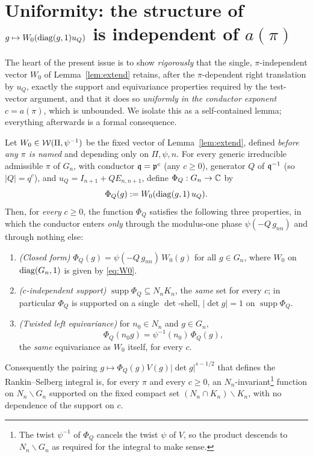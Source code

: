 \section*{Uniformity: the structure of $g\mapsto W_0(\operatorname{diag}(g,1)u_Q)$ is independent of $a(\pi)$}

The heart of the present issue is to show \emph{rigorously} that the single, $\pi$-independent
vector $W_0$ of Lemma~\ref{lem:extend} retains, after the $\pi$-dependent right translation by
$u_Q$, exactly the support and equivariance properties required by the test-vector argument, and
that it does so \emph{uniformly in the conductor exponent} $c=a(\pi)$, which is unbounded. We
isolate this as a self-contained lemma; everything afterwards is a formal consequence.

\begin{qtwolemma}\label{lem:uniform}
Let $W_0\in\mathcal{W}(\Pi,\psi^{-1})$ be the fixed vector of Lemma~\ref{lem:extend}, defined
\emph{before any $\pi$ is named} and depending only on $\Pi,\psi,n$. For every generic
irreducible admissible $\pi$ of $G_n$, with conductor $\mathfrak{q}=\mathfrak{p}^{c}$ \textup{(}any
$c\ge0$\textup{)}, generator $Q$ of $\mathfrak{q}^{-1}$ \textup{(}so $|Q|=q^{c}$\textup{)}, and
$u_Q=I_{n+1}+QE_{n,n+1}$, define $\Phi_Q:G_n\to\mathbb{C}$ by
\[
\Phi_Q(g):=W_0(\operatorname{diag}(g,1)\,u_Q).
\]
Then, for \emph{every} $c\ge0$, the function $\Phi_Q$ satisfies the following three properties,
in which the conductor enters \emph{only} through the modulus-one phase $\psi(-Q\,g_{nn})$ and
through nothing else\textup{:}
\begin{enumerate}[label=\textup{(\roman*)}]\setlength\itemsep{2pt}
\item \emph{\textup{(}Closed form\textup{)}} $\Phi_Q(g)=\psi(-Q\,g_{nn})\,W_0(g)$ for all
$g\in G_n$, where $W_0$ on $\operatorname{diag}(G_n,1)$ is given by \eqref{eq:W0}.
\item \emph{\textup{(}$c$-independent support\textup{)}} $\operatorname{supp}\Phi_Q\subseteq N_nK_n$,
the \emph{same} set for every $c$; in particular $\Phi_Q$ is supported on a single $\det$-shell,
$|\det g|=1$ on $\operatorname{supp}\Phi_Q$.
\item \emph{\textup{(}Twisted left equivariance\textup{)}} for $n_0\in N_n$ and $g\in G_n$,
\[
\Phi_Q(n_0 g)=\psi^{-1}(n_0)\,\Phi_Q(g),
\]
the \emph{same} equivariance as $W_0$ itself, for every $c$.
\end{enumerate}
Consequently the pairing $g\mapsto\Phi_Q(g)V(g)|\det g|^{s-1/2}$ that defines the
Rankin--Selberg integral is, for every $\pi$ and every $c\ge0$, an $N_n$-invariant\footnote{The
twist $\psi^{-1}$ of $\Phi_Q$ cancels the twist $\psi$ of $V$, so the product descends to
$N_n\backslash G_n$ as required for the integral to make sense.} function on
$N_n\backslash G_n$ supported on the fixed compact set $(N_n\cap K_n)\backslash K_n$, with no
dependence of the support on $c$.
\end{qtwolemma}

